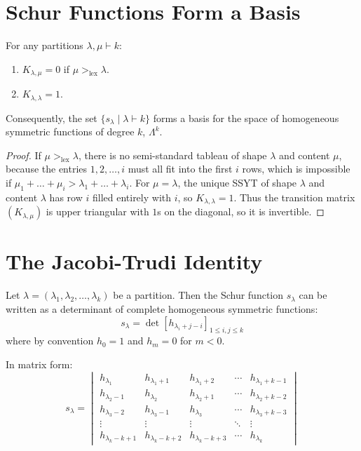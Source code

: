 \documentclass[12pt]{memoir}
\begin{document}
\newpage

\section{Schur Functions Form a Basis}

\begin{ptcb}
\begin{Th}
For any partitions $\lambda, \mu \vdash k$:
\begin{enumerate}
    \item $K_{\lambda, \mu} = 0$ if $\mu >_{\text{lex}} \lambda$.
    \item $K_{\lambda, \lambda} = 1$.
\end{enumerate}
Consequently, the set $\{s_\lambda \mid \lambda \vdash k\}$ forms a basis for the space of homogeneous symmetric functions of degree $k$, $\Lambda^k$.
\end{Th}
\end{ptcb}

\begin{proof}
If $\mu >_{\text{lex}} \lambda$, there is no semi-standard tableau of shape $\lambda$ and content $\mu$, because the entries $1, 2, \dots, i$ must all fit into the first $i$ rows, which is impossible if $\mu_1 + \dots + \mu_i > \lambda_1 + \dots + \lambda_i$. For $\mu = \lambda$, the unique SSYT of shape $\lambda$ and content $\lambda$ has row $i$ filled entirely with $i$, so $K_{\lambda,\lambda} = 1$. Thus the transition matrix $(K_{\lambda, \mu})$ is upper triangular with $1$s on the diagonal, so it is invertible.
\end{proof}

\newpage

\section{The Jacobi-Trudi Identity}

\begin{ptcb}
\begin{Th}
Let $\lambda = (\lambda_1, \lambda_2, \dots, \lambda_k)$ be a partition. Then the Schur function $s_\lambda$ can be written as a determinant of complete homogeneous symmetric functions:
\[
s_\lambda = \det \left[ h_{\lambda_i + j - i} \right]_{1 \le i, j \le k}
\]
where by convention $h_0 = 1$ and $h_m = 0$ for $m < 0$.
\end{Th}
\end{ptcb}

In matrix form:
\[
s_\lambda = \begin{vmatrix}
h_{\lambda_1} & h_{\lambda_1 + 1} & h_{\lambda_1 + 2} & \cdots & h_{\lambda_1 + k - 1} \\
h_{\lambda_2 - 1} & h_{\lambda_2} & h_{\lambda_2 + 1} & \cdots & h_{\lambda_2 + k - 2} \\
h_{\lambda_3 - 2} & h_{\lambda_3 - 1} & h_{\lambda_3} & \cdots & h_{\lambda_3 + k - 3} \\
\vdots & \vdots & \vdots & \ddots & \vdots \\
h_{\lambda_k - k + 1} & h_{\lambda_k - k + 2} & h_{\lambda_k - k + 3} & \cdots & h_{\lambda_k}
\end{vmatrix}
\]
\end{document}
